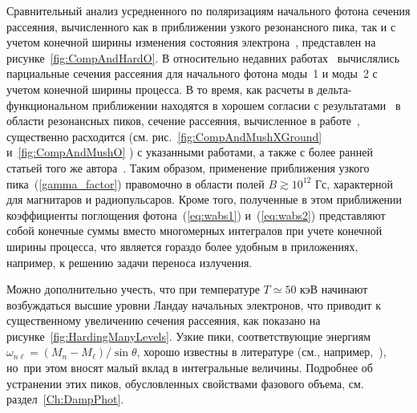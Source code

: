 Сравнительный анализ усредненного по поляризациям начального фотона сечения 
рассеяния, вычисленного как в приближении узкого 
резонансного пика, так 
и с 
учетом 
конечной ширины изменения состояния 
электрона~\cite{Harding:1991,SchwarmD:2017}, представлен на 
рисунке~\ref{fig:CompAndHardO}.  
В относительно недавних работах~\cite{Mushtukov:2016,SchwarmD:2017} 
вычислялись 
парциальные сечения рассеяния для начального фотона моды~1 и моды~2 с учетом 
конечной ширины процесса. В то время, как расчеты в дельта-функциональном 
приближении находятся в хорошем согласии с 
результатами~\cite{Harding:1991,SchwarmD:2017} в области резонансных пиков, 
сечение рассеяния, вычисленное в работе~\cite{Mushtukov:2016}, существенно 
расходится (см. рис.~\ref{fig:CompAndMushXGround} и~\ref{fig:CompAndMushO} ) с 
указанными работами, а также с более ранней статьей того же 
автора~\cite{Mushtukov:2015}. 
Таким образом, применение 
приближения узкого пика~(\ref{gamma_factor}) правомочно  в области полей $B 
\gtrsim 
10^{12}$ Гс, характерной для магнитаров и радиопульсаров. Кроме того, 
полученные в этом приближении коэффициенты поглощения фотона~(\ref{eq:wabs1}) 
и~(\ref{eq:wabs2}) 
представляют собой конечные суммы вместо многомерных интегралов при учете 
конечной ширины процесса, что 
является гораздо более 
удобным в приложениях, например, к решению задачи переноса излучения.

Можно дополнительно учесть, что при температуре $T\simeq 50$ кэВ начинают 
возбуждаться высшие уровни Ландау начальных электронов, что приводит к 
существенному 
увеличению  сечения рассеяния, как показано на 
рисунке~\ref{fig:HardingManyLevels}. Узкие пики, соответствующие 
энергиям $\omega_{n\ell}=(M_n-M_\ell)/\sin \theta$, хорошо известны в 
литературе (см., 
например,~\cite{Pavlov:1991,Klepikov:1954,Baier:2007}), но~при этом вносят 
малый вклад в 
интегральные 
величины. Подробнее об устранении этих пиков, обусловленных свойствами фазового 
объема, см. раздел~\ref{Ch:DampPhot}.

